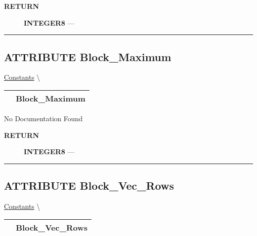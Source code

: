 \par
\begin{description}
\item [\colorbox{tagtype}{\color{white} \textbf{\textsf{RETURN}}}] \textbf{INTEGER8} --- 
\end{description}




\rule{\linewidth}{0.5pt}
\subsection*{\textsf{\colorbox{headtoc}{\color{white} ATTRIBUTE}
Block\_Maximum}}

\hypertarget{ecldoc:pbblas.constants.block_maximum}{}
\hspace{0pt} \hyperlink{ecldoc:PBblas.Constants}{Constants} \textbackslash 

{\renewcommand{\arraystretch}{1.5}
\begin{tabularx}{\textwidth}{|>{\raggedright\arraybackslash}l|X|}
\hline
\hspace{0pt}\mytexttt{\color{red} } & \textbf{Block\_Maximum} \\
\hline
\end{tabularx}
}

\par





No Documentation Found








\par
\begin{description}
\item [\colorbox{tagtype}{\color{white} \textbf{\textsf{RETURN}}}] \textbf{INTEGER8} --- 
\end{description}




\rule{\linewidth}{0.5pt}
\subsection*{\textsf{\colorbox{headtoc}{\color{white} ATTRIBUTE}
Block\_Vec\_Rows}}

\hypertarget{ecldoc:pbblas.constants.block_vec_rows}{}
\hspace{0pt} \hyperlink{ecldoc:PBblas.Constants}{Constants} \textbackslash 

{\renewcommand{\arraystretch}{1.5}
\begin{tabularx}{\textwidth}{|>{\raggedright\arraybackslash}l|X|}
\hline
\hspace{0pt}\mytexttt{\color{red} } & \textbf{Block\_Vec\_Rows} \\
\hline
\end{tabularx}
}

